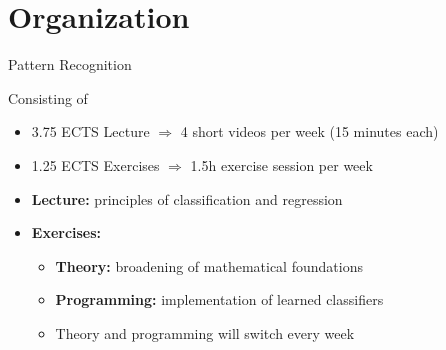 \section{Organization}

\newcommand{\bluefat}[1]{\textcolor{faublue}{\textbf{#1}}}

\begin{frame}[t]{Pattern Recognition}
    \begin{block}{Consisting of}
        \begin{itemize}
            \item 3.75 ECTS Lecture $\Rightarrow$ 4 short videos per week (15 minutes each)
            \item 1.25 ECTS Exercises $\Rightarrow$ 1.5h exercise session per week
        \end{itemize}
    \end{block}

    \vspace{0.3cm}
    \begin{itemize}
        \setlength\itemsep{0.3cm}
        \item \bluefat{Lecture:} principles of classification and regression
        \item \bluefat{Exercises:}
              \vspace{0.3cm}
              \begin{itemize}
                  \setlength\itemsep{0.2cm}
                  \item \bluefat{Theory:} broadening of mathematical foundations
                  \item \bluefat{Programming:} implementation of learned classifiers
                  \item Theory and programming will switch every week
              \end{itemize}
    \end{itemize}

\end{frame}

